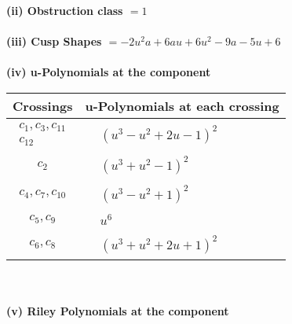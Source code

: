 \documentclass[1p]{elsarticle_modified}
\theoremstyle{definition}
\begin{document}
\flushleft \textbf{(ii) Obstruction class $= 1$}\\~\\
\flushleft \textbf{(iii) Cusp Shapes $= -2 u^2 a+6 a u+6 u^2-9 a-5 u+6$}\\~\\
\newpage\renewcommand{\arraystretch}{1}
\flushleft \textbf{(iv) u-Polynomials at the component}\newline \\
\begin{tabular}{m{50pt}|m{274pt}}
Crossings & \hspace{64pt}u-Polynomials at each crossing \\
\hline $$\begin{aligned}c_{1},c_{3},c_{11}\\c_{12}\end{aligned}$$&$\begin{aligned}
&(u^3- u^2+2 u-1)^2
\end{aligned}$\\
\hline $$\begin{aligned}c_{2}\end{aligned}$$&$\begin{aligned}
&(u^3+u^2-1)^2
\end{aligned}$\\
\hline $$\begin{aligned}c_{4},c_{7},c_{10}\end{aligned}$$&$\begin{aligned}
&(u^3- u^2+1)^2
\end{aligned}$\\
\hline $$\begin{aligned}c_{5},c_{9}\end{aligned}$$&$\begin{aligned}
&u^6
\end{aligned}$\\
\hline $$\begin{aligned}c_{6},c_{8}\end{aligned}$$&$\begin{aligned}
&(u^3+u^2+2 u+1)^2
\end{aligned}$\\
\hline
\end{tabular}\\~\\
\newpage\renewcommand{\arraystretch}{1}
\flushleft \textbf{(v) Riley Polynomials at the component}\newline \\
\end{document}
